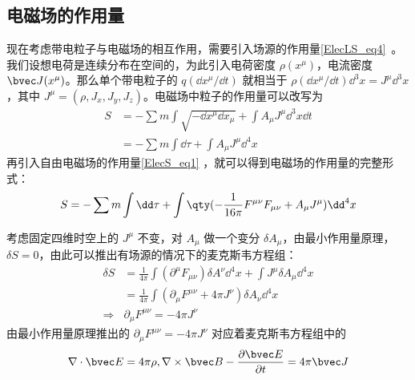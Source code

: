 \subsection{电磁场的作用量}
现在考虑带电粒子与电磁场的相互作用，需要引入场源的作用量\autoref{ElecLS_eq4}~。我们设想电荷是连续分布在空间的，为此引入电荷密度 $\rho(x^\mu)$，电流密度 $\bvec J(x^\mu)$。那么单个带电粒子的 $q(\dd x^\mu/\dd t)$ 就相当于 $\rho (\dd x^\mu / \dd t) {\dd} ^3 x=J^\mu {\dd}^3 x$，其中 $J^\mu=(\rho,J_x,J_y,J_z)$。电磁场中粒子的作用量可以改写为
\begin{equation}
\begin{aligned}
S&=-\sum{m\int \sqrt{-\dd x^\mu \dd x_\mu}}+\int A_\mu J^\mu {\dd}^3 x\dd t\\
&=-\sum{m\int \dd \tau}+\int A_\mu J^\mu {\dd}^4 x
\end{aligned}
\end{equation}
再引入自由电磁场的作用量\autoref{ElecS_eq1} ，就可以得到电磁场的作用量的完整形式：
\begin{equation}\label{ElecS_eq2}
S=-\sum{m\int \dd \tau}+\int \qty(-\frac{1}{16\pi}F^{\mu\nu}F_{\mu\nu}+A_\mu J^\mu ){\dd}^4 x
\end{equation}

考虑固定四维时空上的 $J^\mu$ 不变，对 $A_\mu$ 做一个变分 $\delta A_\mu$，由最小作用量原理，$\delta S=0$，由此可以推出有场源的情况下的麦克斯韦方程组：
\begin{equation}
\begin{aligned}
\delta S&=\frac{1}{4\pi}\int (\partial^\mu F_{\mu\nu})\delta A^\nu {\dd}^4 x +\int J^\mu \delta A_\mu {\dd}^4 x\\
&=\frac{1}{4\pi}\int (\partial_\mu F^{\mu\nu}+4\pi J^\nu)\delta A_\nu {\dd}^4 x\\
\Rightarrow &\partial_\mu F^{\mu\nu}=-4\pi J^\nu
\end{aligned}
\end{equation}
由最小作用量原理推出的 $\partial_\mu F^{\mu\nu}=-4\pi J^\nu$ 对应着麦克斯韦方程组中的
\begin{equation}
\nabla \cdot \bvec E=4\pi \rho,\nabla\times \bvec B-\frac{\partial \bvec E}{\partial t}=4\pi \bvec J
\end{equation}
